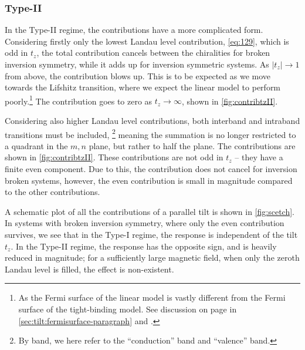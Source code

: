 \subsubsection{Type-II}
In the Type-II regime, the contributions have a more complicated form.
Considering firstly only the lowest Landau level contribution, \cref{eq:129}, which is odd in \( t_z \), the total contribution cancels between the chiralities for broken inversion symmetry, while it adds up for inversion symmetric systems.
As \( |t_z| \to 1 \) from above, the contribution blows up.
This is to be expected as we move towards the Lifshitz transition, where we expect the linear model to perform poorly.\footnote{As the Fermi surface of the linear model is vastly different from the Fermi surface of the tight-binding model.
See discussion on page \pageref{sec:tilt:fermisurface-paragraph} in \cref{sec:tilt:fermisurface-paragraph} and  \textcite{vanderwurffMagnetovorticalThermoelectricTransport2019}.}
The contribution goes to zero as \( t_z \to \infty \), shown in \cref{fig:contribtzII}.

Considering also higher Landau level contributions, both interband and intraband transitions must be included,%
\footnote{By band, we here refer to the ``conduction'' band and ``valence'' band.}
meaning the summation is no longer restricted to a quadrant in the \( m,n \) plane, but rather to half the plane.
The contributions are shown in \cref{fig:contribtzII}.
These contributions are not odd in \( t_z \) -- they have a finite even component.
Due to this, the contribution does not cancel for inversion broken systems, however, the even contribution is small in magnitude compared to the other contributions.

A schematic plot of all the contributions of a parallel tilt is shown in \cref{fig:scetch}.
In systems with broken inversion symmetry, where only the even contribution survives, we see that in the Type-I regime, the response is independent of the tilt \( t_z \).
In the Type-II regime, the response has the opposite sign, and is heavily reduced in magnitude;
for a sufficiently large magnetic field, when only the zeroth Landau level is filled, the effect is non-existent.

